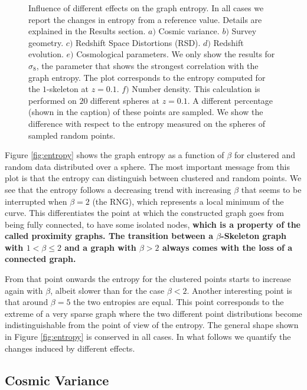 \documentclass[fleqn,usenatbib]{mnras}
\begin{document}
\begin{figure}
    \caption{Influence of different effects on the graph entropy. In all cases we 
    report the changes in entropy from a reference value. 
    Details are explained in the Results section. $a)$ Cosmic variance. 
    $b)$ Survey geometry. 
    $c)$ Redshift Space Distortions (RSD).
    $d)$ Redshift evolution.
    $e)$ Cosmological parameters. We only show the results for $\sigma_8$, 
    the parameter that shows the strongest correlation with the graph entropy.
    The plot corresponds to the entropy computed for the $1$-skeleton at $z=0.1$. 
    $f)$ Number density. 
    This calculation is performed on $20$ different spheres at $z=0.1$.
    A different percentage (shown in the caption) of these points are sampled. 
    We show the difference with respect to the entropy measured on the spheres 
    of sampled random points.\label{fig:diferencias}}
\end{figure}    



Figure \ref{fig:entropy} shows the graph entropy as a function of $\beta$ for
clustered and random data distributed over a sphere.
The most important message from this plot is that the entropy can distinguish between
clustered and random points.
We see that the entropy follows a decreasing trend with increasing $\beta$ that seems to be interrupted when $\beta=2$ (the RNG), which represents a local minimum of the curve. 
This differentiates the point at which the constructed graph goes from being fully connected, to have some isolated nodes,
\textbf{which is a property of the called proximity graphs. The transition between a $\beta$-Skeleton graph with $1<\beta\leq2$ and a graph with $\beta>2$ always comes with the loss of a connected graph.}

From that point onwards the entropy for the clustered points starts to increase again with $\beta$, albeit slower than for the case $\beta<2$.
Another interesting point is that around $\beta=5$ the two entropies are equal. 
This point corresponds to the extreme of a very sparse graph where the two different point distributions become indistinguishable from the point of view of the entropy.
The general shape shown in Figure \ref{fig:entropy} is conserved in all cases. 
In what follows we quantify the changes induced by different effects.

\subsection{Cosmic Variance}
\end{document}
